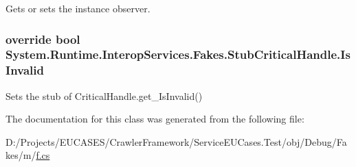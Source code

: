Gets or sets the instance observer.

\hypertarget{class_system_1_1_runtime_1_1_interop_services_1_1_fakes_1_1_stub_critical_handle_abd4e97a71ab3d8a58895b26a4f92f7a2}{
\subsubsection[{Is\-Invalid}]{\setlength{\rightskip}{0pt plus 5cm}override bool System.\-Runtime.\-Interop\-Services.\-Fakes.\-Stub\-Critical\-Handle.\-Is\-Invalid\hspace{0.3cm}{\ttfamily [get]}}}\label{class_system_1_1_runtime_1_1_interop_services_1_1_fakes_1_1_stub_critical_handle_abd4e97a71ab3d8a58895b26a4f92f7a2}


Sets the stub of Critical\-Handle.\-get\-\_\-\-Is\-Invalid()



The documentation for this class was generated from the following file\-:\begin{DoxyCompactItemize}
\item 
D\-:/\-Projects/\-E\-U\-C\-A\-S\-E\-S/\-Crawler\-Framework/\-Service\-E\-U\-Cases.\-Test/obj/\-Debug/\-Fakes/m/\hyperlink{m_2f_8cs}{f.\-cs}\end{DoxyCompactItemize}
